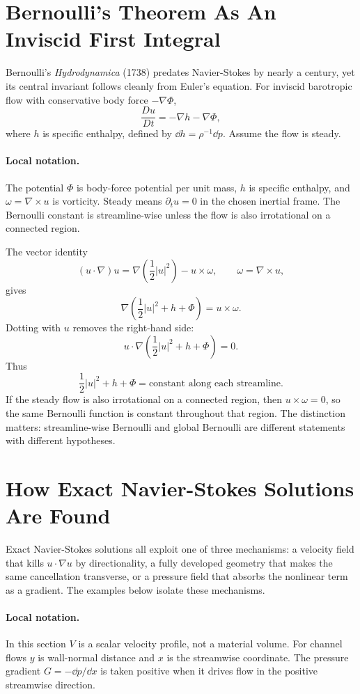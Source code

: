 \section{Bernoulli's Theorem As An Inviscid First Integral}
\label{sec:bernoulli-theorem}

Bernoulli's \emph{Hydrodynamica} (1738) predates Navier-Stokes by nearly a
century, yet its central invariant follows cleanly from Euler's equation. For
inviscid barotropic flow with conservative body force
\(-\nabla\Phi\),
\[
  \frac{D u}{D t}=-\nabla h-\nabla\Phi,
\]
where \(h\) is specific enthalpy, defined by \(\dd h=\rho^{-1}\dd p\). Assume
the flow is steady.

\paragraph{Local notation.}
The potential \(\Phi\) is body-force potential per unit mass, \(h\) is specific
enthalpy, and \(\omega=\nabla\times u\) is vorticity.  Steady means
\(\partial_tu=0\) in the chosen inertial frame.  The Bernoulli constant is
streamline-wise unless the flow is also irrotational on a connected region.

The vector identity
\[
  (u\cdot\nabla)u
  =
  \nabla\left(\frac12|u|^2\right)-u\times\omega,
  \qquad
  \omega=\nabla\times u,
\]
gives
\[
  \nabla\left(\frac12|u|^2+h+\Phi\right)=u\times\omega.
\]
Dotting with \(u\) removes the right-hand side:
\[
  u\cdot\nabla\left(\frac12|u|^2+h+\Phi\right)=0.
\]
Thus
\[
  \boxed{\frac12|u|^2+h+\Phi=\text{constant along each streamline}.}
\]
If the steady flow is also irrotational on a connected region, then
\(u\times\omega=0\), so the same Bernoulli function is constant throughout that
region. The distinction matters: streamline-wise Bernoulli and global Bernoulli
are different statements with different hypotheses.

\section{How Exact Navier-Stokes Solutions Are Found}
\label{sec:exact-ns-solution-strategy}

Exact Navier-Stokes solutions all exploit one of three mechanisms: a velocity
field that kills \(u\cdot\nabla u\) by directionality, a fully developed
geometry that makes the same cancellation transverse, or a pressure field that
absorbs the nonlinear term as a gradient. The examples below isolate these
mechanisms.

\paragraph{Local notation.}
In this section \(V\) is a scalar velocity profile, not a material volume.
For channel flows \(y\) is wall-normal distance and \(x\) is the streamwise
coordinate.  The pressure gradient \(G=-\dd p/\dd x\) is taken positive when it
drives flow in the positive streamwise direction.

